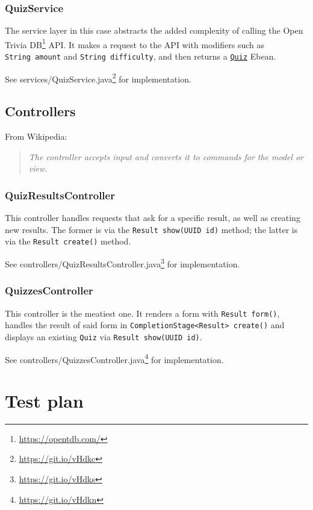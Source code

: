 \documentclass[english,a4paper,]{report}
\renewcommand{\href}[2]{#2\footnote{\url{#1}}}
\begin{document}
\subsection{QuizService}\label{quizservice}

The service layer in this case abstracts the added complexity of calling
the \href{https://opentdb.com/}{Open Trivia DB} API. It makes a request
to the API with modifiers such as \texttt{String\ amount} and
\texttt{String\ difficulty}, and then returns a
\protect\hyperlink{quiz}{\texttt{Quiz}} Ebean.

See \href{https://git.io/vHdkc}{services/QuizService.java} for
implementation.

\section{Controllers}\label{controllers}

From Wikipedia:

\begin{quote}
\emph{The controller accepts input and converts it to commands for the
model or view.}
\end{quote}

\subsection{QuizResultsController}\label{quizresultscontroller}

This controller handles requests that ask for a specific result, as well
as creating new results. The former is via the
\texttt{Result\ show(UUID\ id)} method; the latter is via the
\texttt{Result\ create()} method.

See \href{https://git.io/vHdks}{controllers/QuizResultsController.java}
for implementation.

\subsection{QuizzesController}\label{quizzescontroller}

This controller is the meatiest one. It renders a form with
\texttt{Result\ form()}, handles the result of said form in
\texttt{CompletionStage\textless{}Result\textgreater{}\ create()} and
displays an existing \texttt{Quiz} via \texttt{Result\ show(UUID\ id)}.

See \href{https://git.io/vHdkn}{controllers/QuizzesController.java} for
implementation.

\chapter{Test plan}\label{test-plan}
\end{document}
